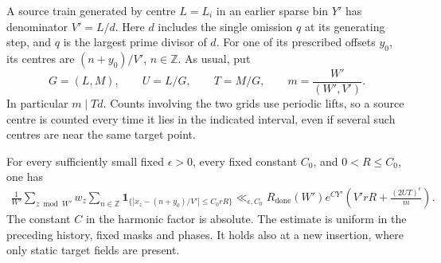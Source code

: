 A source train generated by centre $L=L_i$ in an earlier sparse bin $Y'$
has denominator $V'=L/d$.  Here $d$ includes the single omission $q$
at its generating step, and $q$ is the largest prime divisor of $d$.
For one of its prescribed offsets $y_0$, its centres are
$(n+y_0)/V'$, $n\in\mathbb Z$.  As usual, put
\[
 G=(L,M),\qquad U=L/G,\qquad T=M/G,
 \qquad m=\frac{W'}{(W',V')}.
\]
In particular $m\mid Td$.  Counts involving the two grids use periodic
lifts, so a source centre is counted every time it lies in the indicated
interval, even if several such centres are near the same target point.

\begin{lemma}
\label{part:target-grid}
For every sufficiently small fixed $\epsilon>0$, every fixed constant
$C_0$, and $0<R\le C_0$, one has
\begin{equation}
\begin{split}
 \frac{1}{W'}\sum_{z\bmod W'}w_z
 \sum_{n\in\mathbb Z}
 \mathbf 1_{\{|x_z-(n+y_0)/V'|\le C_0rR\}}
 \ll_{\epsilon,C_0}
 R_{\mathrm{done}}(W')e^{CY'}
 \left(V'rR+\frac{(2UT)^\epsilon}{m}\right).
\end{split}
\label{eq:target-grid}
\end{equation}
The constant $C$ in the harmonic factor is absolute.  The estimate is
uniform in the preceding history, fixed masks and phases.  It holds also
at a new insertion, where only static target fields are present.
\end{lemma}

